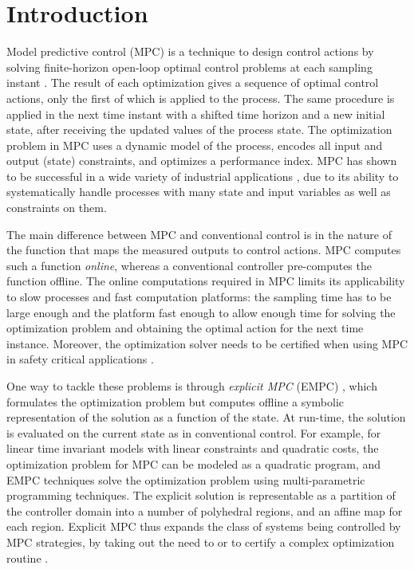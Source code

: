 \section{Introduction}

Model predictive control (MPC) is a technique to design control actions by solving finite-horizon open-loop
optimal control problems at each sampling instant \cite{RMD17}.
The result of each optimization gives a sequence of optimal control actions, only the first of which is applied
to the process.
The same procedure is applied in the next time instant with a shifted time horizon and a new initial state, 
after receiving the updated values of the process state.
The optimization problem in MPC uses a dynamic model of the process, encodes all input and output (state) constraints, and 
optimizes a performance index. 
MPC has shown to be successful in a wide variety of industrial applications \cite{QinBadgwell03}, due to its 
ability to systematically handle processes with many state and input variables as well as constraints on them. 

The main difference between MPC and conventional control is in the nature of the function that maps the measured outputs to control actions. 
MPC computes such a function \emph{online}, whereas a conventional controller pre-computes the function offline.
The online computations required in MPC limits its applicability to slow processes and fast computation platforms: 
the sampling time has to be large enough and the platform fast enough to allow enough time for solving the optimization problem
and obtaining the optimal action for the next time instance. 
Moreover, the optimization solver needs to be certified when using MPC in safety critical applications .

One way to tackle these problems is through \emph{explicit MPC} (EMPC) \cite{Bemporad:2002,Alessio2009}, which formulates the optimization
problem but computes offline a symbolic representation of the solution as a function of the state.
At run-time, the solution is evaluated on the current state as in conventional control.
For example, for linear time invariant models with linear constraints and quadratic costs, the optimization
problem for MPC can be modeled as a quadratic program, and EMPC techniques solve the optimization problem
using multi-parametric programming techniques.
The explicit solution is representable as a partition of the controller domain into a number of polyhedral regions,
and an affine map for each region. 
Explicit MPC thus expands the class of systems being controlled by MPC strategies, by taking out the need to 
or to certify a complex optimization routine .

